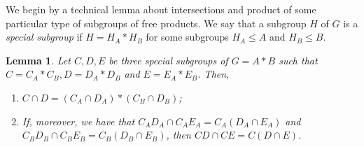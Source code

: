 \documentclass[11pt,letterpaper]{amsart}
\newtheorem{lemma}[prop]{Lemma}
\begin{document}
We begin by a technical lemma about intersections and product of some particular type of subgroups of free products.
We say that a subgroup $H$ of $G$ is a \textit{special subgroup} if $H = H_A * H_B$ for some subgroups $H_A \leq A$ and $H_B \leq B$.

\begin{lemma}\label{lem:freeProductIntersection}
    Let $C,D,E$ be three special subgroups of $G = A * B$ such that $C = C_A * C_B, D = D_A * D_B$ and $E = E_A * E_B$. Then,
    \begin{enumerate}
        \item $C \cap D = (C_A \cap D_A) * (C_B \cap D_B)$;
        \item If, moreover, we have that $C_AD_A \cap C_AE_A = C_A(D_A \cap E_A)$ and $C_BD_B \cap C_BE_B = C_B(D_B \cap E_B)$, then $CD \cap CE = C(D \cap E)$.
    \end{enumerate}
\end{lemma}
\end{document}
